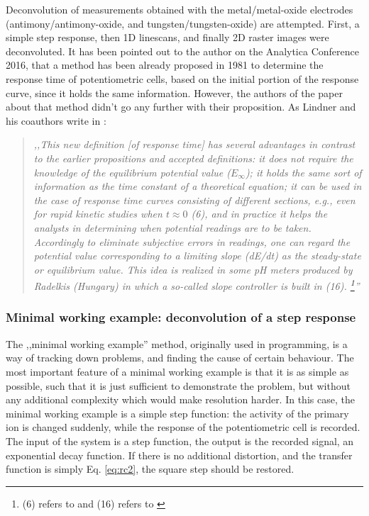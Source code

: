 Deconvolution of measurements obtained with the metal/metal-oxide electrodes (antimony/antimony-oxide, and tungsten/tungsten-oxide) are attempted.
First, a simple step response, then 1D linescans, and finally 2D raster images were deconvoluted.
It has been pointed out to the author on the Analytica Conference 2016, that a method has been already proposed in 1981 to determine the response time of potentiometric cells, based on the initial portion of the response curve, since it holds the same information.
However, the authors of the paper about that method didn't go any further with their proposition.
As Lindner and his coauthors write in \cite{lindner1984definition}:

\begin{quote}
\vspace{0.5cm}
\emph{,,This new definition [of response time] has several advantages in contrast to the earlier propositions and accepted definitions: it does not require the knowledge of the equilibrium potential value ($E_{\infty}$); it holds the same sort of information as the time constant of a theoretical equation; it can be used in the case of response time curves consisting of different sections, e.g., even for rapid kinetic studies when $t \approx 0$ (6), and in practice it helps the analysts in determining when potential readings are to be taken.
Accordingly to eliminate subjective errors in readings, one can regard the potential value corresponding to a limiting slope (dE/dt) as the steady-state or equilibrium value.
This idea is realized in some pH meters produced by Radelkis (Hungary) in which a so-called slope controller is built in (16).
\footnote{(6) refers to \cite{lindner1982response} and (16) refers to \cite{havas1981}}''}
\vspace{0.5cm}
\end{quote}


			\subsubsection{Minimal working example: deconvolution of a step response}
The ,,minimal working example'' method, originally used in programming, is a way of tracking down problems, and finding the cause of certain behaviour.
The most important feature of a minimal working example is that it is as simple as possible, such that it is just sufficient to demonstrate the problem, but without any additional complexity which would make resolution harder.
In this case, the minimal working example is a simple step function: the activity of the primary ion is changed suddenly, while the response of the potentiometric cell is recorded.
The input of the system is a step function, the output is the recorded signal, an exponential decay function.
If there is no additional distortion, and the transfer function is simply Eq. \ref{eq:rc2}, the square step should be restored. 

